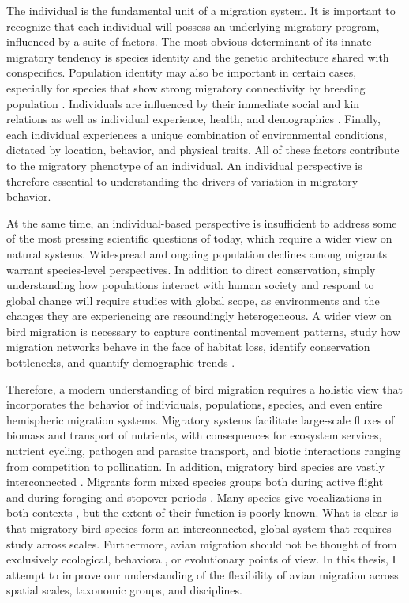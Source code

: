 \documentclass[a4paper, nobind]{templates/ociamthesis}
\begin{document}
The individual is the fundamental unit of a migration system. It is important to recognize that each individual will possess an underlying migratory program, influenced by a suite of factors. The most obvious determinant of its innate migratory tendency is species identity and the genetic architecture shared with conspecifics. Population identity may also be important in certain cases, especially for species that show strong migratory connectivity by breeding population \autocite[see][]{websterLinksWorldsUnraveling2002}. Individuals are influenced by their immediate social and kin relations as well as individual experience, health, and demographics \autocite{newtonMigrationEcologyBirds2008,briedisMigratoryConnectivityContext2018}. Finally, each individual experiences a unique combination of environmental conditions, dictated by location, behavior, and physical traits. All of these factors contribute to the migratory phenotype of an individual. An individual perspective is therefore essential to understanding the drivers of variation in migratory behavior.

At the same time, an individual-based perspective is insufficient to address some of the most pressing scientific questions of today, which require a wider view on natural systems. Widespread and ongoing population declines among migrants warrant species-level perspectives. In addition to direct conservation, simply understanding how populations interact with human society and respond to global change will require studies with global scope, as environments and the changes they are experiencing are resoundingly heterogeneous. A wider view on bird migration is necessary to capture continental movement patterns, study how migration networks behave in the face of habitat loss, identify conservation bottlenecks, and quantify demographic trends \autocite[see][]{dokterSeasonalAbundanceSurvival2018}.

Therefore, a modern understanding of bird migration requires a holistic view that incorporates the behavior of individuals, populations, species, and even entire hemispheric migration systems. Migratory systems facilitate large-scale fluxes of biomass and transport of nutrients, with consequences for ecosystem services, nutrient cycling, pathogen and parasite transport, and biotic interactions ranging from competition to pollination. In addition, migratory bird species are vastly interconnected \autocite{cohenChancingSpectacleCooccurring2020}. Migrants form mixed species groups both during active flight \autocite{larkinEvidenceWidelyDispersed2008} and during foraging and stopover periods \autocite{rodewaldHabitatUseBehavior2002}. Many species give vocalizations in both contexts \autocite{farnsworthFlightCallsTheir2005}, but the extent of their function is poorly known. What is clear is that migratory bird species form an interconnected, global system that requires study across scales. Furthermore, avian migration should not be thought of from exclusively ecological, behavioral, or evolutionary points of view. In this thesis, I attempt to improve our understanding of the flexibility of avian migration across spatial scales, taxonomic groups, and disciplines.
\end{document}
